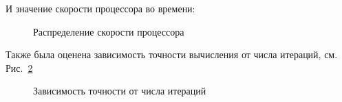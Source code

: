 \documentclass{article}
\begin{document}
И значение скорости процессора во времени:\\

\begin{figure}[h]
\caption{Распределение скорости процессора}
\label{ris:speed}
\end{figure}


Также была оценена зависимость точности вычисления от числа итераций, см. Рис.~\ref{ris:PREC_iter}\\

\begin{figure}[h]
\caption{Зависимость точности от числа итераций}
\label{ris:PREC_iter}
\end{figure}
\end{document}
